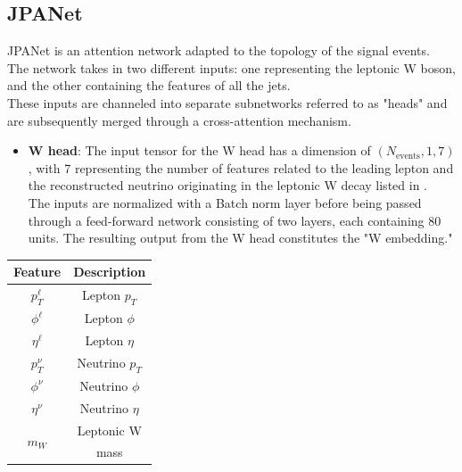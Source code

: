 \subsection{JPANet}
JPANet is an attention network adapted to the topology of the signal events.\\
The network takes in two different inputs: one representing the leptonic W boson, and the other containing the features of all the jets.\\
These inputs are channeled into separate subnetworks referred to as "heads" and are subsequently merged through a cross-attention mechanism.\\



\begin{minipage}{0.6\linewidth}
\begin{itemize}
    \item \textbf{W head}: The input tensor for the W head has a dimension of $(N_{\text{events}},1,7)$, with 7 representing the number of features related to the leading lepton and the reconstructed neutrino originating in the leptonic W decay listed in .\\
    The inputs are normalized with a Batch norm layer before being passed through a feed-forward network consisting of two layers, each containing 80 units.
    The resulting output from the W head constitutes the "W embedding."
\end{itemize}
\end{minipage}
    \hfill
\begin{minipage}{0.35\linewidth}
        \centering
        \fontsize{11pt}{11pt}\selectfont
        \begin{tabular}{c|c}
            \toprule
             \textbf{Feature}& \textbf{Description} \\
             \midrule
             
             $p_T^\ell$& Lepton $p_T$ \\
             $\phi^\ell$& Lepton $\phi$ \\
             $\eta^\ell$& Lepton $\eta$ \\
             \midrule
             $ p_T^\nu$& Neutrino $p_T$ \\
             $\phi^\nu$& Neutrino $\phi$ \\
             $\eta^\nu$& Neutrino $\eta$ \\
             \midrule
             \multirow{2}{*}{$m_W$} &Leptonic W\\
             &mass\\
             \bottomrule
        \end{tabular}
        \label{tab:Whead}
\end{minipage}
